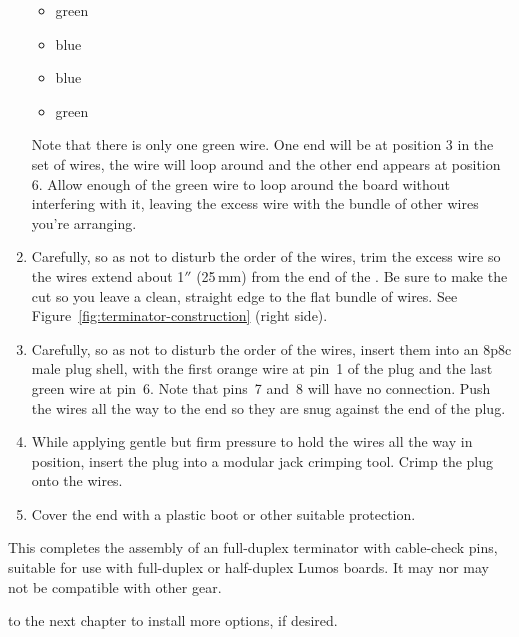 \documentclass[letterpaper,twoside,onecolumn,openright,final]{memoir}
\begin{document}
\begin{enumerate}
\begin{itemize}
	\item	green
	\item	blue
	\item	blue
	\item	green
	\end{itemize}
	Note that there is only one green wire.  One end will be at position 3 in the set of wires,
	the wire will loop around and the other end appears at position 6.  Allow enough of the green
	wire to loop around the board without interfering with it, leaving the excess wire with the
	bundle of other wires you're arranging.
\item	Carefully, so as not to disturb the order of the wires, trim the excess wire so the 
	wires extend about 1$''$ (25\,mm) from the
	end of the .  Be sure to make the 
	cut so you leave a clean, straight edge to the flat bundle of wires.
	See Figure~\ref{fig:terminator-construction} (right side).
\item	Carefully, so as not to disturb the order of the wires, insert them into an 8p8c male plug
	shell, with the first orange wire at pin~1 of the plug and the last green wire at pin~6.
	Note that pins~7 and~8 will have no connection.  Push the wires all the way to the end so they
	are snug against the end of the plug.
\item	While applying gentle but firm pressure to hold the wires all the way in position, insert the
	plug into a modular jack crimping tool. Crimp the plug onto the wires.
\item	Cover the end with a plastic boot or other suitable protection.
\end{enumerate}

This completes the assembly of an  full-duplex terminator with cable-check pins, suitable
for use with full-duplex or half-duplex Lumos boards.  It may nor may not be compatible with other
 gear.

\bigskip{} to the next chapter to install more options, if desired.
\end{document}
